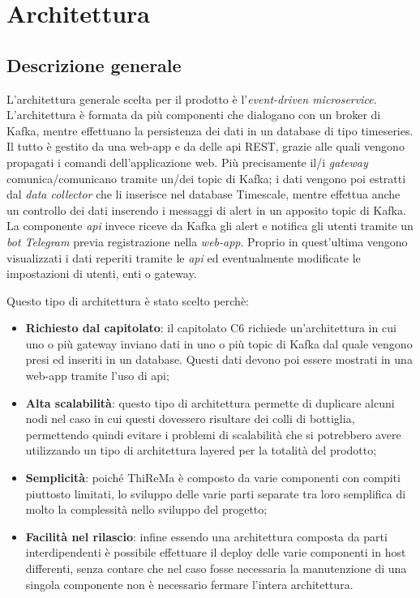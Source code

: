\section{Architettura} 
	\subsection{Descrizione generale}
		L'architettura generale scelta per il prodotto è l'\textit{event-driven microservice}. 
		L'architettura è formata da più componenti che dialogano con un broker di Kafka, mentre effettuano la persistenza dei dati in un database di tipo timeseries. Il tutto è gestito da una web-app e da delle api REST, grazie alle quali vengono propagati i comandi dell'applicazione web.
		Più precisamente il/i \textit{gateway} comunica/comunicano tramite un/dei topic di Kafka; i dati vengono poi estratti dal \textit{data collector} che li inserisce nel database Timescale, mentre effettua anche un controllo dei dati inserendo i messaggi di alert in un apposito topic di Kafka. La componente \textit{api} invece riceve da Kafka gli alert e notifica gli utenti tramite un \textit{bot Telegram} previa registrazione nella \textit{web-app}. Proprio in quest'ultima vengono visualizzati i dati reperiti tramite le \textit{api} ed eventualmente modificate le impostazioni di utenti, enti o gateway.

		Questo tipo di architettura è stato scelto perchè:
		\begin{itemize}
		 	\item \textbf{Richiesto dal capitolato}: il capitolato C6 richiede un'architettura in cui uno o più gateway inviano dati in uno o più topic di Kafka dal quale vengono presi ed inseriti in un database. Questi dati devono poi essere mostrati in una web-app tramite l'uso di api;
		 	\item \textbf{Alta scalabilità}: questo tipo di architettura permette di duplicare alcuni nodi nel caso in cui questi dovessero risultare dei colli di bottiglia, permettendo quindi evitare i problemi di scalabilità che si potrebbero avere utilizzando un tipo di architettura layered per la totalità del prodotto;
		 	\item \textbf{Semplicità}: poiché ThiReMa è composto da varie componenti con compiti piuttosto limitati, lo sviluppo delle varie parti separate tra loro semplifica di molto la complessità nello sviluppo del progetto;
		 	\item \textbf{Facilità nel rilascio}: infine essendo una architettura composta da parti interdipendenti è possibile effettuare il deploy delle varie componenti in host differenti, senza contare che nel caso fosse necessaria la manutenzione di una singola componente non è necessario fermare l'intera architettura.
		\end{itemize}

